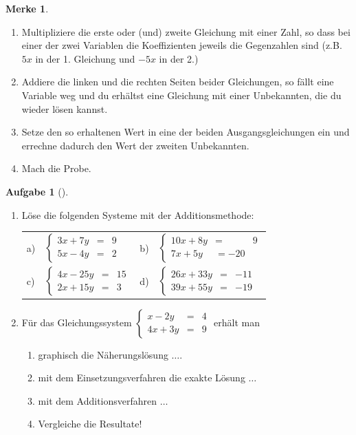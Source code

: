 \documentclass[a4paper, twoside, parskip, 10pt, smallheadings]{scrbook}
\theoremstyle{plain}
\theoremstyle{definition}
\newtheorem{Auf}{Aufgabe}%
\newtheorem*{Mer}{Merke}
\newenvironment{fshaded}{%
\def\FrameCommand{\fcolorbox{framecolor}{shadecolor}}%
\MakeFramed {\FrameRestore}}%
{\endMakeFramed}
\newenvironment{fauf}[1][]{\definecolor{shadecolor}{rgb}{.58,.788,1}%
\definecolor{framecolor}{rgb}{.13,.25,.9}%
\begin{fshaded}\begin{Auf}[#1]}{\end{Auf}\end{fshaded}}
\newcommand{\ba}{\begin{fauf}}
\newcommand{\ea}{\end{fauf}}
\newcommand{\bn}{\begin{enumerate}}
\newcommand{\en}{\end{enumerate}}
\newcommand{\bme}{\begin{Mer}}
\newcommand{\eme}{\end{Mer}}
\newcommand{\bt}{\begin{tabular}}
\newcommand{\et}{\end{tabular}}
\begin{document}
\bme \bn \item  Multipliziere die erste oder (und) zweite Gleichung mit einer Zahl, so dass bei einer der
zwei Variablen die Koeffizienten jeweils die Gegenzahlen sind (z.B. $5x$ in der 1. Gleichung und $-5x$ in der
2.)

\item  Addiere die linken und die rechten Seiten beider Gleichungen, so f\"{a}llt eine Variable weg und du erh\"{a}ltst
eine Gleichung mit einer Unbekannten, die du wieder l\"{o}sen kannst.

\item Setze den so erhaltenen Wert in eine der beiden Ausgangsgleichungen ein und errechne dadurch den Wert
der zweiten Unbekannten.

\item  Mach die Probe.
\en \eme



\ba \bn \item  L\"{o}se die folgenden Systeme mit der Additionsmethode:


\bt{llll}
 a) & $    \left\{ \begin{array}{rcl}    3x +7y    & = &  9           \\
                                5x-4y    & = &   2          \end{array} \right.    $      &
  b) & $  \left\{ \begin{array}{rcl}      10x+8y & = & 9            \\
                                         7x+5y & = -20&             \end{array} \right.       $ \\
 c) & $     \left\{ \begin{array}{rcl}  4x-25y   & = & 15            \\
                                         2x+15y  & = &  3           \end{array} \right.   $      &
 d) & $ \left\{ \begin{array}{rcl}    26x+33y     & = & -11            \\
                                      39x+55y     & = &    -19         \end{array} \right.        $ \et




\item  F\"{u}r das Gleichungssystem $ \left\{ \begin{array}{rcl} x-2y   & = & 4         \\
                                      4x+3y     & = &    9         \end{array} \right.$
erh\"{a}lt man \bn \item graphisch die N\"{a}herungsl\"{o}sung $\dots$. \item mit dem Einsetzungsverfahren die exakte
L\"{o}sung $\dots$ \item mit dem Additionsverfahren $\dots$ \item  Vergleiche die Resultate! \en \en \ea
\end{document}
